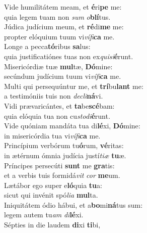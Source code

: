 \oddverse Vide humilitátem meam, et \textbf{é}ri\textbf{pe} me:~\*\\
\oddverse quia legem tuam non \textit{sum} \textit{o}\textbf{blí}tus.\\
\evenverse Júdica judícium meum, et \textbf{ré}di\textbf{me} me:~\*\\
\evenverse propter elóquium tuum vi\textit{ví}\textit{fi}\textbf{ca} me.\\
\oddverse Longe a pecca\textbf{tó}ribus \textbf{sa}lus:~\*\\
\oddverse quia justificatiónes tuas non ex\textit{qui}\textit{si}\textbf{é}runt.\\
\evenverse Misericórdiæ tuæ \textbf{mul}tæ, \textbf{Dó}mine:~\*\\
\evenverse secúndum judícium tuum vi\textit{ví}\textit{fi}\textbf{ca} me.\\
\oddverse Multi qui persequúntur me, et \textbf{trí}bu\textbf{lant} me:~\*\\
\oddverse a testimóniis tuis non \textit{de}\textit{cli}\textbf{ná}vi.\\
\evenverse Vidi prævaricántes, et \textbf{ta}be\textbf{scé}bam:~\*\\
\evenverse quia elóquia tua non cu\textit{sto}\textit{di}\textbf{é}runt.\\
\oddverse Vide quóniam mandáta tua di\textbf{lé}xi, \textbf{Dó}mine:~\*\\
\oddverse in misericórdia tua vi\textit{ví}\textit{fi}\textbf{ca} me.\\
\evenverse Princípium verbórum tu\textbf{ó}rum, \textbf{vé}ritas:~\*\\
\evenverse in ætérnum ómnia judícia justí\textit{ti}\textit{æ} \textbf{tu}æ.\\
\oddverse Príncipes persecúti \textbf{sunt} me \textbf{gra}tis:~\*\\
\oddverse et a verbis tuis formidá\textit{vit} \textit{cor} \textbf{me}um.\\
\evenverse Lætábor ego super e\textbf{ló}quia \textbf{tu}a:~\*\\
\evenverse sicut qui invénit spó\textit{li}\textit{a} \textbf{mul}ta.\\
\oddverse Iniquitátem ódio hábui, et a\textbf{bo}mi\textbf{ná}tus sum:~\*\\
\oddverse legem autem tu\textit{am} \textit{di}\textbf{lé}xi.\\
\evenverse Sépties in die laudem \textbf{di}xi \textbf{ti}bi,~\*\\
